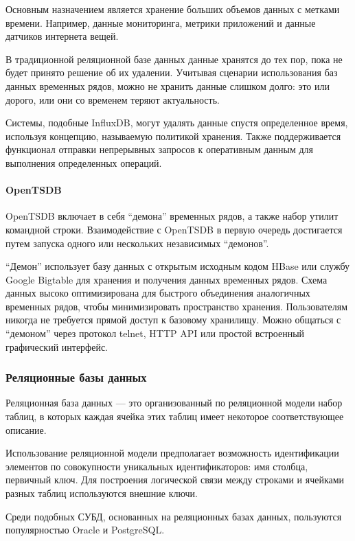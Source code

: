 Основным назначением является хранение больших объемов данных с метками времени. Например, данные мониторинга, метрики приложений и данные датчиков интернета вещей.

В традиционной реляционной базе данных данные хранятся до тех пор, пока не будет принято решение об их удалении. Учитывая сценарии использования баз данных временных рядов, можно не хранить данные слишком долго: это или дорого, или они со временем теряют актуальность. \cite{ryadi}

Системы, подобные InfluxDB, могут удалять данные спустя определенное время, используя концепцию, называемую политикой хранения. Также поддерживается функционал отправки непрерывных запросов к оперативным данным для выполнения определенных операций. \cite{ryadi}

\paragraph{OpenTSDB}
OpenTSDB включает в себя ``демона'' временных рядов, а также набор утилит командной строки. Взаимодействие с OpenTSDB в первую очередь достигается путем запуска одного или нескольких независимых ``демонов''.

``Демон'' использует базу данных с открытым исходным кодом HBase или службу Google Bigtable для хранения и получения данных временных рядов. Схема данных высоко оптимизирована для быстрого объединения аналогичных временных рядов, чтобы минимизировать пространство хранения. Пользователям никогда не требуется прямой доступ к базовому хранилищу. Можно общаться с ``демоном'' через протокол telnet, HTTP API или простой встроенный графический интерфейс.

\subsubsection{Реляционные базы данных}
Реляционная база данных --- это организованный по реляционной модели набор таблиц, в которых каждая ячейка этих таблиц имеет некоторое соответствующее описание. \cite{relationki}

Использование реляционной модели предполагает возможность идентификации элементов по совокупности уникальных идентификаторов: имя столбца, первичный ключ. Для построения логической связи между строками и ячейками разных таблиц используются внешние ключи. \cite{relationki}

Среди подобных СУБД, основанных на реляционных базах данных, пользуются популярностью Oracle и PostgreSQL.

